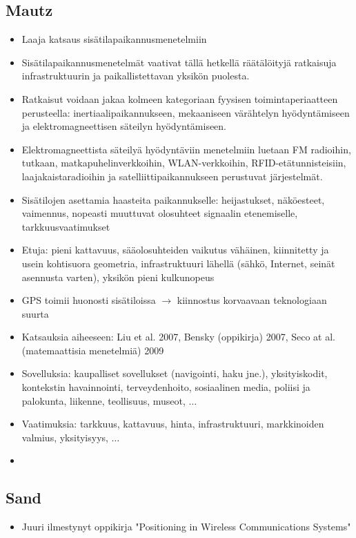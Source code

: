 \documentclass[a4paper]{scrartcl}
\begin{document}
\subsection{Mautz\cite{mautz2012indoor}}
\begin{itemize}
	\item Laaja katsaus sisätilapaikannusmenetelmiin
	\item Sisätilapaikannusmenetelmät vaativat tällä hetkellä räätälöityjä
		ratkaisuja infrastruktuurin ja paikallistettavan yksikön puolesta.
	\item Ratkaisut voidaan jakaa kolmeen kategoriaan fyysisen
		toimintaperiaatteen perusteella: inertiaalipaikannukseen, mekaaniseen
		värähtelyn hyödyntämiseen ja elektromagneettisen säteilyn hyödyntämiseen.
	\item Elektromagneettista säteilyä hyödyntäviin menetelmiin luetaan
		FM radioihin, tutkaan, matkapuhelinverkkoihin, WLAN-verkkoihin,
		RFID-etätunnisteisiin, laajakaistaradioihin ja satelliittipaikannukseen
		perustuvat järjestelmät.
	\item Sisätilojen asettamia haasteita paikannukselle: heijastukset,
		näköesteet, vaimennus, nopeasti muuttuvat olosuhteet signaalin etenemiselle,
		tarkkuusvaatimukset
	\item Etuja: pieni kattavuus, sääolosuhteiden vaikutus vähäinen, kiinnitetty
		ja usein kohtisuora geometria, infrastruktuuri lähellä (sähkö, Internet,
		seinät asennusta varten), yksikön pieni kulkunopeus
	\item GPS toimii huonosti sisätiloissa $\rightarrow$ kiinnostus
		korvaavaan teknologiaan suurta
	\item Katsauksia aiheeseen: Liu et al. 2007, Bensky (oppikirja) 2007,
		Seco at al. (matemaattisia menetelmiä) 2009
	\item Sovelluksia: kaupalliset sovellukset (navigointi, haku jne.),
		yksityiskodit, kontekstin havainnointi, terveydenhoito, sosiaalinen media,
    poliisi ja palokunta, liikenne, teollisuus, museot, $\dots$
  \item Vaatimuksia: tarkkuus, kattavuus, hinta, infrastruktuuri,
    markkinoiden valmius, yksityisyys, $\ldots$
  \item
\end{itemize}

\cite{faragher2012opportunistic}

\subsection{Sand\cite{sand2014positioning}}
\begin{itemize}
  \item Juuri ilmestynyt oppikirja "Positioning in Wireless Communications
    Systems"
\end{itemize}
\end{document}
